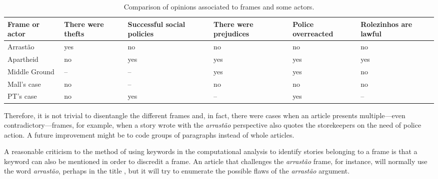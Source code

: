 \begin{table}
\centering
\begin{tabular}{@{}p{3cm}p{2cm}p{2cm}p{2cm}p{2cm}p{2cm}@{}}
\toprule
Frame or actor       & There were thefts & Successful social policies & There were prejudices & Police overreacted & Rolezinhos are lawful \\
\midrule
Arrastão              & yes                                  & no                                                           & no                                                       & no                                       & no                          \\
Apartheid             & no                                   & yes                                                          & yes                                                      & yes                                      & yes                         \\
Middle Ground         & --                                   & --                                                           & yes                                                      & yes                                      & no                          \\
Mall's case           & no                                   & --                                                           & no                                                       & no                                       & no                          \\
PT's case & no                                   & yes                                                          & --                                                       & yes                                      & --                          \\
\bottomrule
\end{tabular}
\caption{Comparison of opinions associated to frames and some actors.}
\label{tab_comparison}
\end{table}

Therefore, it is not trivial to disentangle the different frames and, in fact, there were cases when an article presents multiple---even contradictory---frames, for example, when a story wrote with the \emph{arrastão} perspective also quotes the storekeepers on the need of police action. A future improvement might be to code groups of paragraphs instead of whole articles.

A reasonable criticism to the method of using keywords in the computational analysis to identify stories belonging to a frame is that a keyword can also be mentioned in order to discredit a frame. An article that challenges the \emph{arrastão} frame, for instance, will normally use the word \emph{arrastão}, perhaps in the title \autocite{badernamidiatica}, but it will try to enumerate the possible flaws of the \emph{arrastão} argument.

